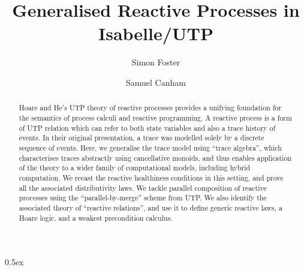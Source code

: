 \documentclass[11pt,a4paper]{article}
\begin{document}
\title{Generalised Reactive Processes in Isabelle/UTP}

\author{Simon Foster \and Samuel Canham}

\maketitle

\begin{abstract}
  Hoare and He's UTP theory of reactive processes provides a unifying foundation for the semantics
  of process calculi and reactive programming. A reactive process is a form of UTP relation which
  can refer to both state variables and also a trace history of events. In their original presentation,
  a trace was modelled solely by a discrete sequence of events. Here, we generalise the trace model 
  using ``trace algebra'', which characterises traces abstractly using cancellative monoids, and 
  thus enables application of the theory to a wider family of computational models, including 
  hybrid computation. We recast the reactive healthiness conditions in this setting, and prove
  all the associated distributivity laws. We tackle parallel composition of reactive processes
  using the ``parallel-by-merge'' scheme from UTP. We also identify the associated theory of
  ``reactive relations'', and use it to define generic reactive laws, a Hoare logic, and a weakest
  precondition calculus.
\end{abstract}

\tableofcontents

\parindent 0pt\parskip 0.5ex





\end{document}
